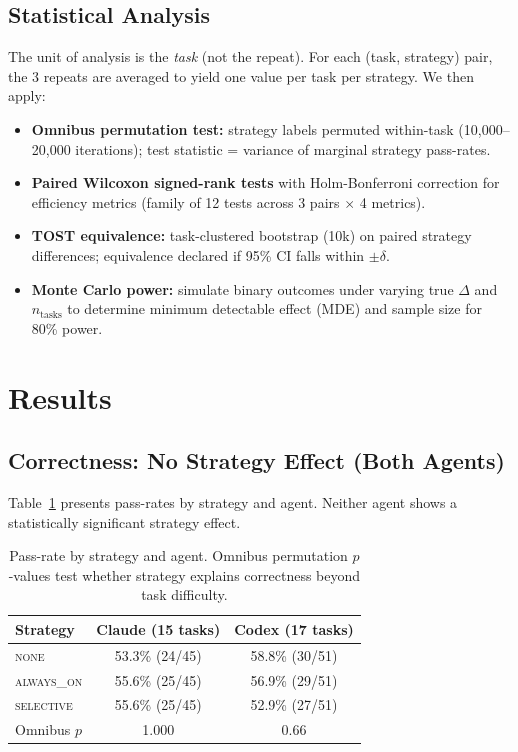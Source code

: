 \documentclass[11pt]{article}
\newcommand{\none}{\textsc{none}}
\newcommand{\alwayson}{\textsc{always\_on}}
\newcommand{\selective}{\textsc{selective}}
\begin{document}
\subsection{Statistical Analysis}

The unit of analysis is the \emph{task} (not the repeat).
For each (task, strategy) pair, the 3 repeats are averaged to yield one value per task per strategy.
We then apply:
\begin{itemize}
    \item \textbf{Omnibus permutation test:} strategy labels permuted within-task (10,000--20,000 iterations); test statistic = variance of marginal strategy pass-rates.
    \item \textbf{Paired Wilcoxon signed-rank tests} with Holm-Bonferroni correction for efficiency metrics (family of 12 tests across 3 pairs $\times$ 4 metrics).
    \item \textbf{TOST equivalence:} task-clustered bootstrap (10k) on paired strategy differences; equivalence declared if 95\% CI falls within $\pm\delta$.
    \item \textbf{Monte Carlo power:} simulate binary outcomes under varying true $\Delta$ and $n_{\text{tasks}}$ to determine minimum detectable effect (MDE) and sample size for 80\% power.
\end{itemize}

\section{Results}

\subsection{Correctness: No Strategy Effect (Both Agents)}
\label{sec:results-correctness}

Table~\ref{tab:correctness} presents pass-rates by strategy and agent.
Neither agent shows a statistically significant strategy effect.

\begin{table}[t]
\centering
\small
\caption{Pass-rate by strategy and agent. Omnibus permutation $p$-values test whether strategy explains correctness beyond task difficulty.}
\label{tab:correctness}
\begin{tabular}{lcc}
\toprule
\textbf{Strategy} & \textbf{Claude (15 tasks)} & \textbf{Codex (17 tasks)} \\
\midrule
\none        & 53.3\% (24/45) & 58.8\% (30/51) \\
\alwayson    & 55.6\% (25/45) & 56.9\% (29/51) \\
\selective   & 55.6\% (25/45) & 52.9\% (27/51) \\
\midrule
Omnibus $p$  & 1.000          & 0.66 \\
\bottomrule
\end{tabular}
\end{table}
\end{document}
